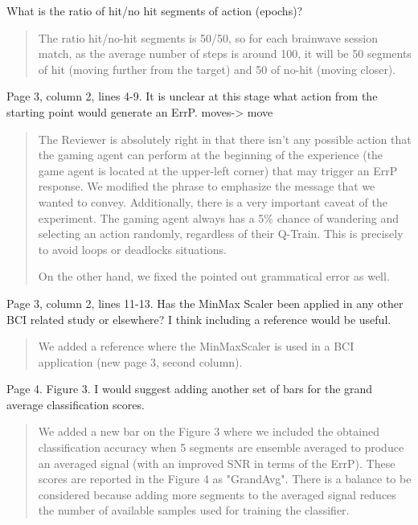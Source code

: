 \documentclass[journal,onecolumn,12pt]{IEEEtran}
\begin{document}
What is the ratio of hit/no hit segments of action (epochs)?


\begin{quotation}
{\color{blue}
The ratio hit/no-hit segments is 50/50, so for each brainwave session match, as the average number of steps is around 100, it will be 50 segments of hit (moving further from the target) and 50 of no-hit (moving closer).  
}
\end{quotation}


Page 3, column 2, lines 4-9. It is unclear at this stage what action from the starting point would generate an ErrP.
moves-> move

\begin{quotation}
{\color{blue}
The Reviewer is absolutely right in that there isn't any possible action that the gaming agent can perform at the beginning of the experience (the game agent is located at the upper-left corner) that may trigger an ErrP response.  We modified the phrase to emphasize the message that we wanted to convey.  Additionally, there is a very important caveat of the experiment. The gaming agent always has a 5\% chance of wandering and selecting an action randomly, regardless of their Q-Train.  This is precisely to avoid loops or deadlocks situations.

On the other hand, we fixed the pointed out grammatical error as well.
}
\end{quotation}


Page 3, column 2, lines 11-13. Has the MinMax Scaler been applied in any other BCI related study or elsewhere? I think including a reference would be useful.

\begin{quotation}
{\color{blue}
We added a reference where the MinMaxScaler is used in a BCI application (new page 3, second column).
}
\end{quotation}

Page 4. Figure 3. I would suggest adding another set of bars for the grand average classification scores.

\begin{quotation}
{\color{blue}
We added a new bar on the Figure 3 where we included the obtained classification accuracy when 5 segments are ensemble averaged to produce an averaged signal (with an improved SNR in terms of the ErrP).   These scores are reported in the Figure 4 as "GrandAvg".  There is a balance to be considered because adding more segments to the averaged signal reduces the number of available samples used for training the classifier.
}
\end{quotation}
\end{document}
